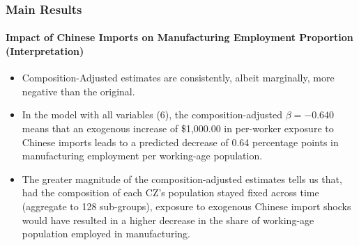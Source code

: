 \begin{frame}
    \frametitle{Main Results}
    \framesubtitle{Impact of Chinese Imports on Manufacturing Employment Proportion (Interpretation)}
    \begin{itemize}
        \item Composition-Adjusted estimates are consistently, albeit marginally, more negative than the original.
        \item In the model with all variables (6), the composition-adjusted $\beta = -0.640$ means that an exogenous increase of \$1,000.00 in per-worker exposure to Chinese imports leads to a predicted decrease of 0.64 percentage points in manufacturing employment per working-age population.
        \item The greater magnitude of the composition-adjusted estimates tells us that, had the composition of each CZ's population stayed fixed across time (aggregate to 128 sub-groups), exposure to exogenous Chinese import shocks would have resulted in a higher decrease in the share of working-age population employed in manufacturing.
    \end{itemize}
\end{frame}
